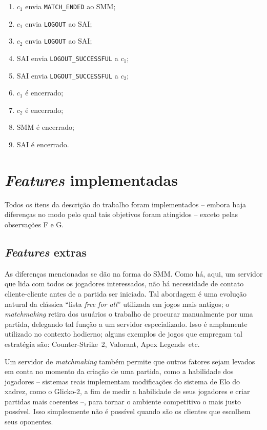 \documentclass{article}
\begin{document}
\begin{multicols}{2}
\begin{enumerate}
      \item $c_1$ envia \texttt{MATCH\_ENDED} ao SMM;
      \item $c_1$ envia \texttt{LOGOUT} ao SAI;
      \item $c_2$ envia \texttt{LOGOUT} ao SAI;
      \item SAI envia \texttt{LOGOUT\_SUCCESSFUL} a $c_1$;
      \item SAI envia \texttt{LOGOUT\_SUCCESSFUL} a $c_2$;
      \item $c_1$ é encerrado;
      \item $c_2$ é encerrado;
      \item SMM é encerrado;
      \item SAI é encerrado.
    \end{enumerate}
    
    \section{\textit{Features} implementadas}
    
    Todos os itens da descrição do trabalho foram implementados -- embora haja diferenças no modo pelo qual tais objetivos foram atingidos -- exceto pelas observações F e G.
    
    \subsection{\textit{Features} extras}
    
    As diferenças mencionadas se dão na forma do SMM. Como há, aqui, um servidor que lida com todos os jogadores interessados, não há necessidade de contato cliente-cliente antes de a partida ser iniciada. Tal abordagem é uma evolução natural da clássica ``lista \textit{free for all}'' utilizada em jogos mais antigos; o \textit{match\-mak\-ing} retira dos usuários o trabalho de procurar manualmente por uma partida, delegando tal função a um servidor especializado. Isso é amplamente utilizado no contexto hodierno; alguns exemplos de jogos que empregam tal estratégia são: Counter-Strike\texttrademark\ 2, Valorant\texttrademark, Apex Legends\texttrademark\ etc.
    
    Um servidor de \textit{matchmaking} também permite que outros fatores sejam levados em conta no momento da criação de uma partida, como a habilidade dos jogadores -- sistemas reais implementam modificações do sistema de Elo do xadrez, como o Glicko-2, a fim de medir a habilidade de seus jogadores e criar partidas mais coerentes --, para tornar o ambiente competitivo o mais justo possível. Isso simplesmente não é possível quando são os clientes que escolhem seus oponentes.
    

\end{multicols}
\end{document}
